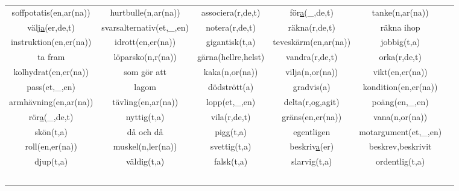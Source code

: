 \begin{center}
    \begin{adjustwidth}{-2cm}{}
        \begin{tabular}{|c c c c c c|}
            \hline
            soffpotatis(en,ar(na)) & hurtbulle(n,ar(na)) & associera(r,de,t) & för\underline{a}(\_,de,t) & tanke(n,ar(na)) & \\
            välj\underline{a}(er,de,t) & svarsalternativ(et,\_,en) & notera(r,de,t) & räkna(r,de,t) & räkna ihop & \\
            instruktion(en,er(na)) & idrott(en,er(na)) & gigantisk(t,a) & teveskärm(en,ar(na)) & jobbig(t,a) & \\
            ta fram & löparsko(n,r(na)) & gärna(hellre,helst) & vandra(r,de,t) & orka(r,de,t) & \\
            kolhydrat(en,er(na)) & som gör att & kaka(n,or(na)) & vilja(n,or(na)) & vikt(en,er(na)) & \\
            pass(et,\_,en) & lagom & dödstrött(a) & gradvis(a) & kondition(en,er(na)) & \\
            armhävning(en,ar(na)) & tävling(en,ar(na)) & lopp(et,\_,en) & delta(r,og,agit) & poäng(en,\_,en) & \\
            rör\underline{a}(\_,de,t) & nyttig(t,a) & vila(r,de,t) & gräns(en,er(na)) & vana(n,or(na)) & \\
            skön(t,a) & då och då & pigg(t,a) & egentligen & motargument(et,\_,en) & \\
            roll(en,er(na)) & muskel(n,ler(na)) & svettig(t,a) & beskriv\underline{a}(er) & beskrev,beskrivit & \\
            djup(t,a) & väldig(t,a) & falsk(t,a) & slarvig(t,a) & ordentlig(t,a) & \\
             &  &  &  &  & \\
             &  &  &  &  & \\
             &  &  &  &  & \\
             &  &  &  &  & \\
             &  &  &  &  & \\
            \hline
        \end{tabular}
    \end{adjustwidth}
\end{center}

